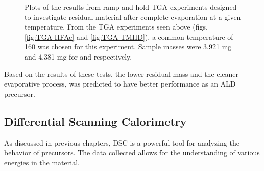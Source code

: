 \begin{figure}[htbp]
   \centering
	\hspace{1cm}
   \caption[Constant Temperature TGA Experiments]%
   		{Plots of the results from ramp-and-hold TGA experiments designed to investigate residual material %
		after complete evaporation at a given temperature. From the TGA experiments seen above (figs.~%
		\vref{fig:TGA-HFAc} and \vref{fig:TGA-TMHD}), a common temperature of 160\degC{} was chosen %
		for this experiment. Sample masses were 3.921 mg and 4.381 mg for \HFAc{} and \TMHD{} respectively.}
   \label{fig:TGA-Hold}
\end{figure}

Based on the results of these tests, the lower residual mass and the cleaner evaporative process, \TMHD{} was predicted to have better performance as an ALD precursor. 


\subsection{Differential Scanning Calorimetry}

As discussed in previous chapters, DSC is a powerful tool for analyzing the behavior of precursors. The data collected allows for the understanding of various energies in the material. 

